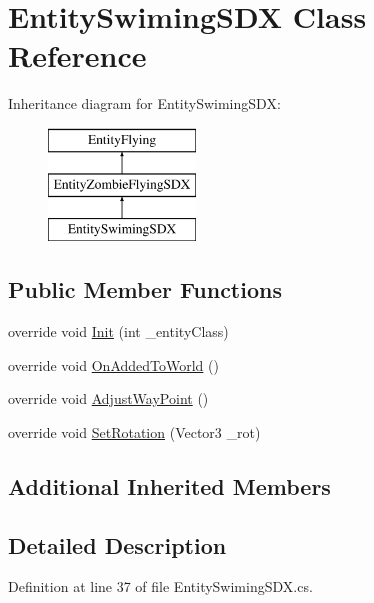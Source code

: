 \hypertarget{class_entity_swiming_s_d_x}{}\section{Entity\+Swiming\+S\+DX Class Reference}
\label{class_entity_swiming_s_d_x}
Inheritance diagram for Entity\+Swiming\+S\+DX\+:\begin{figure}[H]
\begin{center}
\leavevmode
\includegraphics[height=3.000000cm]{d7/d75/class_entity_swiming_s_d_x}
\end{center}
\end{figure}
\subsection*{Public Member Functions}
\begin{DoxyCompactItemize}
\item 
override void \mbox{\hyperlink{class_entity_swiming_s_d_x_acc349e8ff9afcdf5cbbadb8c4b2e8f92}{Init}} (int \+\_\+entity\+Class)
\item 
override void \mbox{\hyperlink{class_entity_swiming_s_d_x_a7ad69a9b6d2777bb904742c40b3eb4fe}{On\+Added\+To\+World}} ()
\item 
override void \mbox{\hyperlink{class_entity_swiming_s_d_x_a8af397ffcf21b5433962243f2e110373}{Adjust\+Way\+Point}} ()
\item 
override void \mbox{\hyperlink{class_entity_swiming_s_d_x_ac234efe645a6e92f4c73aa182b98d601}{Set\+Rotation}} (Vector3 \+\_\+rot)
\end{DoxyCompactItemize}
\subsection*{Additional Inherited Members}


\subsection{Detailed Description}


Definition at line 37 of file Entity\+Swiming\+S\+D\+X.\+cs.



